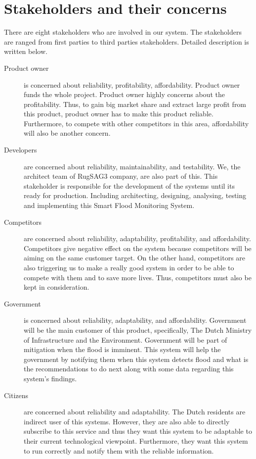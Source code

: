 \section{Stakeholders and their concerns}


There are eight stakeholders who are involved in our system. The stakeholders are ranged from first parties to third parties stakeholders. Detailed description is written below.

\begin{description}
\item[Product owner] is concerned about reliability, profitability, affordability. Product owner funds the whole project. Product owner highly concerns about the profitability. Thus, to gain big market share and extract large profit from this product, product owner has to make this product reliable. Furthermore, to compete with other competitors in this area, affordability will also be another concern.
\item[Developers] are concerned about reliability, maintainability, and testability. We, the architect team of RugSAG3 company, are also part of this. This stakeholder is responsible for the development of the systems until its ready for production. Including architecting, designing, analysing, testing and implementing this Smart Flood Monitoring System.
\item[Competitors] are concerned about reliability, adaptability, profitability, and affordability. Competitors give negative effect on the system because competitors will be aiming on the same customer target. On the other hand, competitors are also triggering us to make a really good system in order to be able to compete with them and to save more lives. Thus, competitors must also be kept in consideration.
\item[Government] is concerned about reliability, adaptability, and affordability. Government will be the main customer of this product, specifically, The Dutch Ministry of Infrastructure and the Environment. Government will be part of mitigation when the flood is imminent. This system will help the government by notifying them when this system detects flood and what is the recommendations to do next along with some data regarding this system's findings.
\item[Citizens] are concerned about reliability and adaptability. The Dutch residents are indirect user of this systems. However, they are also able to directly subscribe to this service and thus they want this system to be adaptable to their current technological viewpoint. Furthermore, they want this system to run correctly and notify them with the reliable information.

\end{description}
